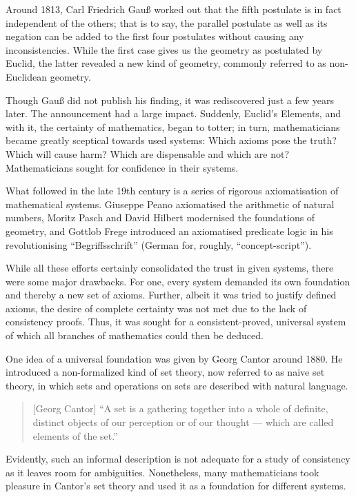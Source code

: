 \documentclass[hidelinks]{article}
\begin{document}
Around 1813, Carl Friedrich Gauß worked out that the fifth postulate is in fact independent of the others; that is to say, the parallel postulate as well as its negation can be added to the first four postulates without causing any inconsistencies. While the first case gives us the geometry as postulated by Euclid, the latter revealed a new kind of geometry, commonly referred to as non-Euclidean geometry.

Though Gauß did not publish his finding, it was rediscovered just a few years later. The announcement had a large impact. Suddenly, Euclid's Elements, and with it, the certainty of mathematics, began to totter; in turn, mathematicians became greatly sceptical towards used systems: Which axioms pose the truth? Which will cause harm? Which are dispensable and which are not? Mathematicians sought for confidence in their systems.

What followed in the late 19th century is a series of rigorous axiomatisation of mathematical systems. Giuseppe Peano axiomatised the arithmetic of natural numbers, Moritz Pasch and David Hilbert modernised the foundations of geometry, and Gottlob Frege introduced an axiomatised predicate logic in his revolutionising ``Begriffsschrift'' (German for, roughly, ``concept-script'').

While all these efforts certainly consolidated the trust in given systems, there were some major drawbacks. For one, every system demanded its own foundation and thereby a new set of axioms. Further, albeit it was tried to justify defined axioms, the desire of complete certainty was not met due to the lack of consistency proofs. Thus, it was sought for a consistent-proved, universal system of which all branches of mathematics could then be deduced.

One idea of a universal foundation was given by Georg Cantor around 1880. He introduced a non-formalized kind of set theory, now referred to as naive set theory, in which sets and operations on sets are described with natural language. 

\begin{quote}[Georg Cantor]
``A set is a gathering together into a whole of definite, distinct objects of our perception or of our thought --- which are called elements of the set.''\cite{cantor_set}
\end{quote}

Evidently, such an informal description is not adequate for a study of consistency as it leaves room for ambiguities. Nonetheless, many mathematicians took pleasure in Cantor's set theory and used it as a foundation for different systems.
\end{document}
